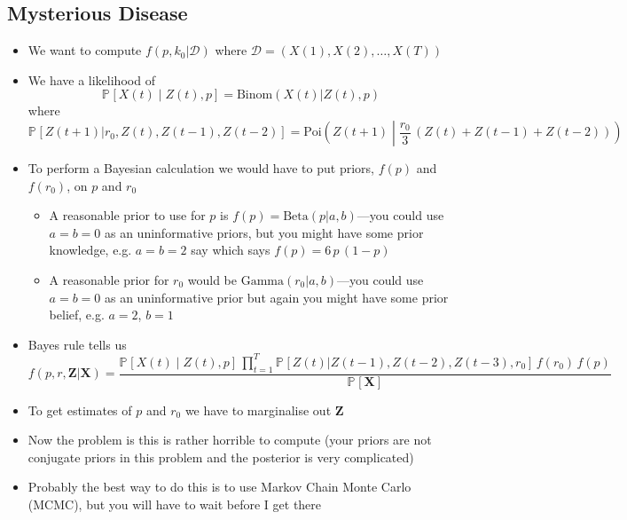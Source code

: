 \documentclass[11pt]{article}
\newcommand{\Prob}[2][]{\mathbb{P}_{#1\!}\left[ #2 \right]}
\begin{document}
\subsection{Mysterious Disease}
\label{sec:orgb02f1d5}
\begin{itemize}
\item We want to compute \(f(p,k_0|\mathcal{D})\) where
\(\mathcal{D}=(X(1), X(2), \ldots, X(T))\)
\item We have a likelihood of 
$$ \Prob{X(t)\middle|Z(t),p} = \mathrm{Binom}(X(t)|Z(t), p) $$
where
$$ \Prob{Z(t+1)|r_0,Z(t),Z(t-1),Z(t-2)} = \mathrm{Poi}\!\left(Z(t+1)\middle|
     \frac{r_0}{3}\, (Z(t)+Z(t-1)+Z(t-2)) \right) $$
\item To perform a Bayesian calculation we would have to put priors,
\(f(p)\) and \(f(r_0)\), on \(p\) and \(r_0\)
\begin{itemize}
\item A reasonable prior to use for \(p\) is \(f(p) =
       \mathrm{Beta}(p|a,b)\)---you could use \(a=b=0\) as an uninformative
priors, but you might have some prior knowledge, e.g. \(a=b=2\) say
which says \(f(p)=6\,p\,(1-p)\)
\item A reasonable prior for \(r_0\) would be
\(\mathrm{Gamma}(r_0|a,b)\)---you could use \(a=b=0\) as an
uninformative prior but again you might have some prior belief, e.g. \(a=2\), \(b=1\)
\end{itemize}
\item Bayes rule tells us
$$ f(p,r,\bm{Z}|\bm{X}) = \frac{\Prob{X(t)\middle|Z(t),p}\, \prod\limits_{t=1}^T
     \Prob{Z(t)|Z(t-1),Z(t-2),Z(t-3),r_0} \,
     f(r_0)\,f(p)}{\Prob{\bm{X}}} $$
\item To get estimates of \(p\) and \(r_0\) we have to marginalise out \(\bm{Z}\)
\item Now the problem is this is rather horrible to compute (your
priors are not conjugate priors in this problem and the posterior
is very complicated)
\item Probably the best way to do this is to use Markov Chain Monte
Carlo (MCMC), but you will have to wait before I get there
\end{itemize}
\end{document}
